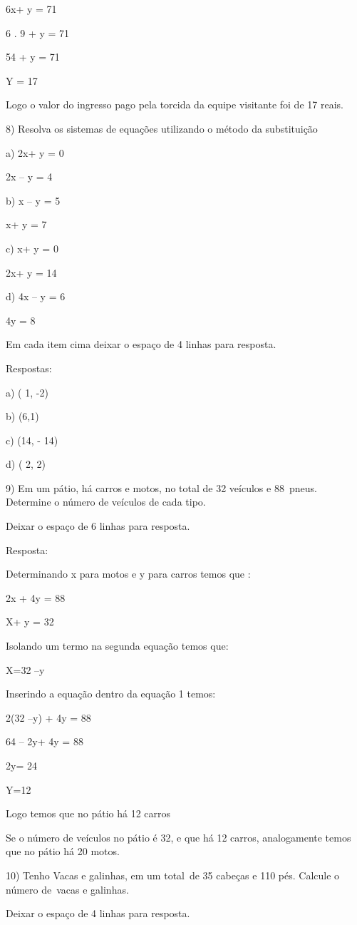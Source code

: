6x+ y = 71

6 . 9 + y = 71

54 + y = 71

Y = 17

Logo o valor do ingresso pago pela torcida da equipe visitante foi de 17
reais.

8) Resolva os sistemas de equações utilizando o método da substituição

a) 2x+ y = 0

2x -- y = 4

b) x -- y = 5

x+ y = 7

c) x+ y = 0

2x+ y = 14

d) 4x -- y = 6

4y = 8

Em cada item cima deixar o espaço de 4 linhas para resposta.

Respostas:

a) ( 1, -2)

b) (6,1)

c) (14, - 14)

d) ( 2, 2)

9) Em um pátio, há carros e motos, no total de 32 veículos e 88~pneus.
Determine o número de veículos de cada tipo.

Deixar o espaço de 6 linhas para resposta.

Resposta:

Determinando x para motos e y para carros temos que :

2x + 4y = 88

X+ y = 32

Isolando um termo na segunda equação temos que:

X=32 --y

Inserindo a equação dentro da equação 1 temos:

2(32 --y) + 4y = 88

64 -- 2y+ 4y = 88

2y= 24

Y=12

Logo temos que no pátio há 12 carros

Se o número de veículos no pátio é 32, e que há 12 carros, analogamente
temos que no pátio há 20 motos.

10) Tenho Vacas e galinhas, em um total~de 35 cabeças e 110 pés. Calcule
o número de~vacas e galinhas.

Deixar o espaço de 4 linhas para resposta.

